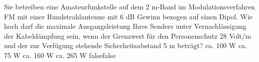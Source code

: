     {Sie betreiben eine Amateurfunkstelle auf dem 2 m-Band im Modulationsverfahren FM mit einer Rundstrahlantenne mit 6 dB Gewinn bezogen auf einen Dipol. Wie hoch darf die maximale Ausgangsleistung Ihres Senders unter Vernachlässigung der Kabeldämpfung sein, wenn der Grenzwert für den Personenschutz 28 Volt/m und der zur Verfügung stehende Sicherheitsabstand 5 m beträgt?}
    {ca. 100 W}
    {ca. 75 W}
    {ca. 160 W}
    {ca. 265 W}
    {false}{false}